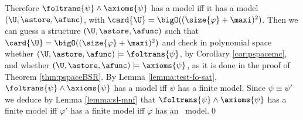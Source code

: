 {  Therefore $\foltrans{\psi} \wedge \axioms{\psi}$ has a model iff it
  has a model $(\U,\astore,\afunc)$, with $\card{\U} =
  \bigO((\size{\varphi}+\maxi)^2)$. Then we can guess a structure
  $(\U,\astore,\afunc)$ such that $\card{\U} =
  \bigO((\size{\varphi}+\maxi)^2)$ and check in polynomial space
  whether $(\U,\astore,\afunc) \models \foltrans{\psi}$, by Corollary
  \ref{cor:pspacemc}, and whether $(\U,\astore,\afunc) \models
  \axioms{\psi}$, as it is done in the proof of Theorem
  \ref{thm:pspaceBSR}. By Lemma \ref{lemma:test-fo-sat},
  $\foltrans{\psi} \wedge \axioms{\psi}$ has a model iff $\psi$ has a
  finite model. Since $\psi \equiv \psi'$ we deduce by Lemma
  \ref{lemma:sl-mnf} that $\foltrans{\psi} \wedge \axioms{\psi}$ has a
  finite model iff $\varphi'$ has a finite model iff $\varphi$ has an
  \controlled\ model.\qed}

